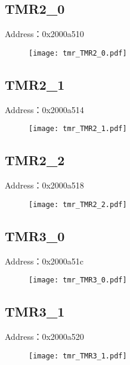 \subsection{TMR2\_0}
\label{tmr-TMR2-0}
Address：0x2000a510
 \begin{figure}[H]
\texttt{[image: tmr\_TMR2\_0.pdf]}
\end{figure}

\subsection{TMR2\_1}
\label{tmr-TMR2-1}
Address：0x2000a514
 \begin{figure}[H]
\texttt{[image: tmr\_TMR2\_1.pdf]}
\end{figure}

\subsection{TMR2\_2}
\label{tmr-TMR2-2}
Address：0x2000a518
 \begin{figure}[H]
\texttt{[image: tmr\_TMR2\_2.pdf]}
\end{figure}

\subsection{TMR3\_0}
\label{tmr-TMR3-0}
Address：0x2000a51c
 \begin{figure}[H]
\texttt{[image: tmr\_TMR3\_0.pdf]}
\end{figure}

\subsection{TMR3\_1}
\label{tmr-TMR3-1}
Address：0x2000a520
 \begin{figure}[H]
\texttt{[image: tmr\_TMR3\_1.pdf]}
\end{figure}

